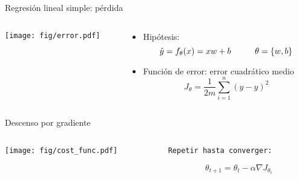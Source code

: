 \documentclass[aspectratio=169,9pt]{beamer}
\begin{document}
\begin{frame}{Regresión lineal simple: pérdida}
	\begin{columns}
		\begin{column}{0.55\textwidth}
			\begin{flushleft}
				\texttt{[image: fig/error.pdf]}
			\end{flushleft}
		\end{column}
		\begin{column}{0.45\textwidth}
				\begin{itemize}
					\item Hipótesis:
					\begin{equation*}
					\hat{y}=  f_\theta(x) = x  w+b    \hspace{10mm} \theta = \{w,b\} 
					\end{equation*}
					\item Función de error: error cuadrático medio 
					\begin{equation*}
						J_\theta = \frac{1}{2m}  \sum_{i=1}^{n}(y - \hat{y})^2
					\end{equation*}	
				\end{itemize}
		\end{column}
	\end{columns}
\end{frame}

\begin{frame}{Descenso por gradiente}
	\begin{columns}
		\begin{column}{0.55\textwidth}
			\begin{flushleft}
				\texttt{[image: fig/cost\_func.pdf]}
			\end{flushleft}
		\end{column}
		\begin{column}{0.45\textwidth}
			\texttt{Repetir hasta converger:}\\ 
			\begin{center}
				\begin{equation*}
					\theta_{t+1}=\theta_{t}-\alpha \nabla J_{\theta_{t}}
				\end{equation*}
			\end{center}
		\end{column}
	\end{columns}
\end{frame}
\end{document}
